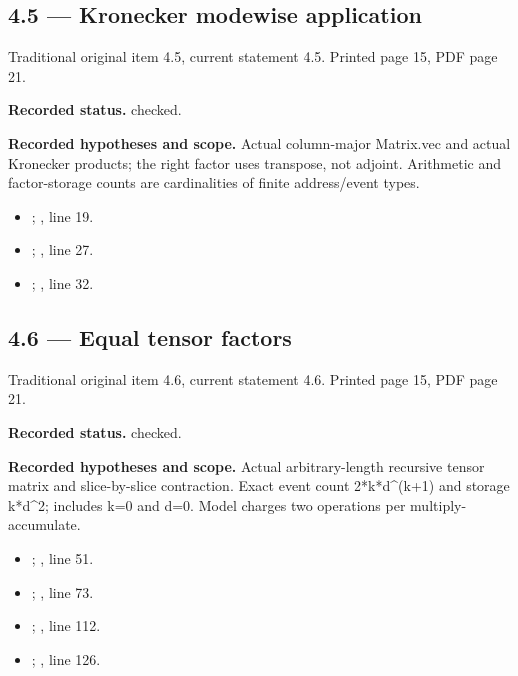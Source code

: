 \subsection{4.5 — Kronecker modewise application}
\label{result:4.5}
{\footnotesize\color{muted}Traditional original item 4.5, current statement 4.5. Printed page 15, PDF page 21.}\par
\textbf{Recorded status.} checked.

\textbf{Recorded hypotheses and scope.} Actual column-major Matrix.vec and actual Kronecker products; the right factor uses transpose, not adjoint. Arithmetic and factor-storage counts are cardinalities of finite address/event types.

\begin{itemize}
\item {}; , line 19.
\item {}; , line 27.
\item {}; , line 32.
\end{itemize}
\subsection{4.6 — Equal tensor factors}
\label{result:4.6}
{\footnotesize\color{muted}Traditional original item 4.6, current statement 4.6. Printed page 15, PDF page 21.}\par
\textbf{Recorded status.} checked.

\textbf{Recorded hypotheses and scope.} Actual arbitrary-length recursive tensor matrix and slice-by-slice contraction. Exact event count 2*k*d\textasciicircum{}(k+1) and storage k*d\textasciicircum{}2; includes k=0 and d=0. Model charges two operations per multiply-accumulate.

\begin{itemize}
\item {}; , line 51.
\item {}; , line 73.
\item {}; , line 112.
\item {}; , line 126.
\end{itemize}
